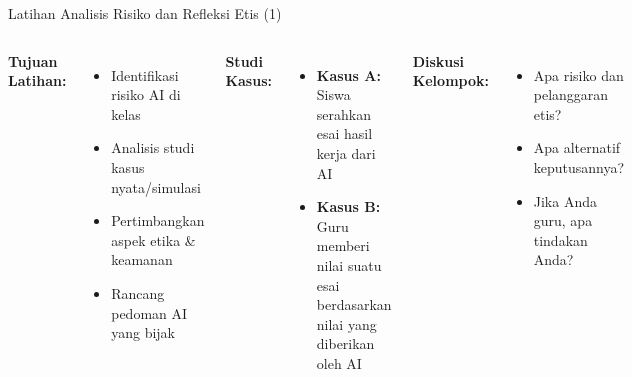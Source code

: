 \documentclass[aspectratio=169, table]{beamer}
\begin{document}
\begin{frame}[fragile]{Latihan Analisis Risiko dan Refleksi Etis (1)}
	\vspace{10pt}
	\begin{columns}[T]
		\textbf{Tujuan Latihan:}
		\begin{itemize}
			\item Identifikasi risiko AI di kelas
			\item Analisis studi kasus nyata/simulasi
			\item Pertimbangkan aspek etika \& keamanan
			\item Rancang pedoman AI yang bijak
		\end{itemize}
		
		
		
		\textbf{Studi Kasus:}
		\begin{itemize}
			\item \textbf{Kasus A:} Siswa serahkan esai hasil kerja dari AI
			\item \textbf{Kasus B:} Guru memberi nilai suatu esai berdasarkan nilai yang diberikan oleh AI
		\end{itemize}
		\vspace{10pt}
		\textbf{Diskusi Kelompok:}
		\begin{itemize}
			\item Apa risiko dan pelanggaran etis?
			\item Apa alternatif keputusannya?
			\item Jika Anda guru, apa tindakan Anda?
		\end{itemize}
	\end{columns}
\end{frame}
\end{document}
